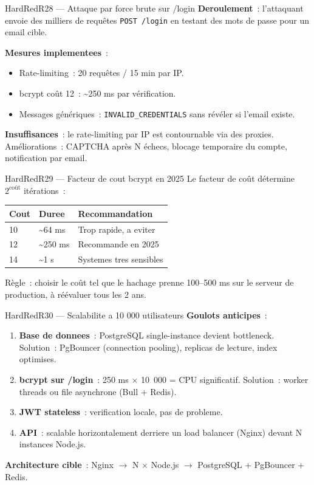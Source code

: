\documentclass[12pt,a4paper,oneside]{report}
\begin{document}
\begin{qbox}{HardRed}{R28 --- Attaque par force brute sur /login}
\textbf{Deroulement}~: l'attaquant envoie des milliers de requêtes
\texttt{POST /login} en testant des mots de passe pour un email cible.

\textbf{Mesures implementees}~:
\begin{itemize}
  \item Rate-limiting~: 20 requêtes / 15 min par IP.
  \item bcrypt coût 12~: \textasciitilde250 ms par vérification.
  \item Messages génériques~: \texttt{INVALID\_CREDENTIALS} sans
        révéler si l'email existe.
\end{itemize}

\textbf{Insuffisances}~: le rate-limiting par IP est contournable via
des proxies. Améliorations~: CAPTCHA après N échecs, blocage temporaire
du compte, notification par email.
\end{qbox}

\begin{qbox}{HardRed}{R29 --- Facteur de cout bcrypt en 2025}
Le facteur de coût détermine $2^{\text{coût}}$ itérations~:

\begin{tabular}{@{}lll@{}}
\toprule
\textbf{Cout} & \textbf{Duree} & \textbf{Recommandation} \\
\midrule
10 & \textasciitilde64 ms  & Trop rapide, a eviter  \\
12 & \textasciitilde250 ms & Recommande en 2025     \\
14 & \textasciitilde1 s    & Systemes tres sensibles\\
\bottomrule
\end{tabular}

\vspace{4pt}
Règle~: choisir le coût tel que le hachage prenne 100--500 ms sur le
serveur de production, à réévaluer tous les 2 ans.
\end{qbox}

\begin{qbox}{HardRed}{R30 --- Scalabilite a 10 000 utilisateurs}
\textbf{Goulots anticipes}~:
\begin{enumerate}
  \item \textbf{Base de donnees}~: PostgreSQL single-instance devient
        bottleneck. Solution~: PgBouncer (connection pooling), replicas
        de lecture, index optimises.
  \item \textbf{bcrypt sur /login}~: 250 ms $\times$ 10~000 = CPU
        significatif. Solution~: worker threads ou file asynchrone
        (Bull + Redis).
  \item \textbf{JWT stateless}~: verification locale, pas de probleme.
  \item \textbf{API}~: scalable horizontalement derriere un load
        balancer (Nginx) devant N instances Node.js.
\end{enumerate}

\textbf{Architecture cible}~:
Nginx $\rightarrow$ N $\times$ Node.js $\rightarrow$ PostgreSQL +
PgBouncer + Redis.
\end{qbox}

\end{document}

